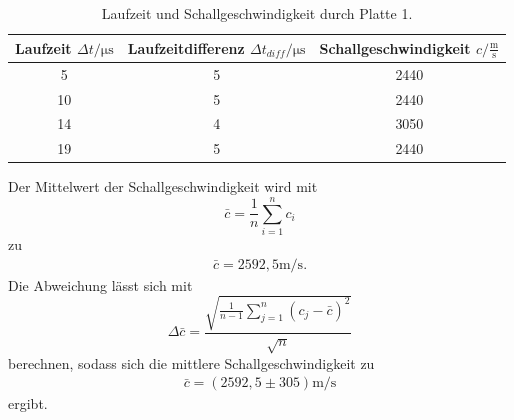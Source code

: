\begin{table}[H]
  \centering
  \caption{Laufzeit und Schallgeschwindigkeit durch Platte 1.}
  \label{tab:ImpLaufzeit}
  \begin{tabular}{S[table-format=2.0] S[table-format=1.0] S[table-format=4.0] }
  \toprule
  {Laufzeit $\Delta t / \si{\micro\second}$} & {Laufzeitdifferenz $\Delta t_{diff} / \si{\micro\second}$} & {Schallgeschwindigkeit $c / \frac{\si{\meter}}{\si{\second}}$}\\
     & 5 & 2440  \\
    10  & 5 & 2440  \\
    14  & 4 & 3050  \\
    19  & 5 & 2440  \\
  \bottomrule
  \end{tabular}
\end{table}
Der Mittelwert der Schallgeschwindigkeit wird mit 
\begin{equation}
  \bar{c}=\frac{1}{n} \sum_{i=1}^n c_i \label{eqn:Mittelwert}
\end{equation}
zu
\begin{align*}
  \bar{c}=2592,5 \si{\meter\per\second}.
\end{align*}
Die Abweichung lässt sich mit
\begin{equation}
  \Delta \bar{c} = \frac{\sqrt{\frac{1}{n-1}\sum_{j=1}^n (c_j-\bar{c})^2}}{\sqrt{n}} \label{eqn:standabw}
\end{equation}
berechnen, sodass sich die mittlere Schallgeschwindigkeit zu
\begin{align*}
  \bar{c}= (2592,5 \pm 305) \si{\meter\per\second}
\end{align*}
ergibt.

